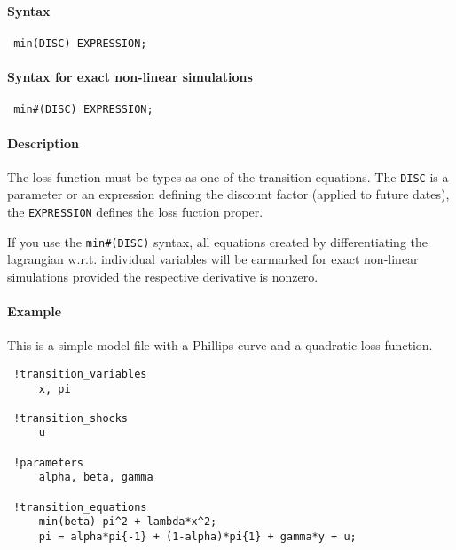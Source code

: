 


	\paragraph{Syntax}
 
 \begin{verbatim}
 min(DISC) EXPRESSION;
 \end{verbatim}
 
 \paragraph{Syntax for exact non-linear simulations}
 
 \begin{verbatim}
 min#(DISC) EXPRESSION;
 \end{verbatim}
 
 \paragraph{Description}
 
 The loss function must be types as one of the transition equations. The
 \texttt{DISC} is a parameter or an expression defining the discount
 factor (applied to future dates), the \texttt{EXPRESSION} defines the
 loss fuction proper.
 
 If you use the \texttt{min\#(DISC)} syntax, all equations created by
 differentiating the lagrangian w.r.t. individual variables will be
 earmarked for exact non-linear simulations provided the respective
 derivative is nonzero.
 
 \paragraph{Example}
 
 This is a simple model file with a Phillips curve and a quadratic loss
 function.
 
 \begin{verbatim}
 !transition_variables
     x, pi
 
 !transition_shocks
     u
 
 !parameters
     alpha, beta, gamma
 
 !transition_equations
     min(beta) pi^2 + lambda*x^2;
     pi = alpha*pi{-1} + (1-alpha)*pi{1} + gamma*y + u;
 \end{verbatim}


